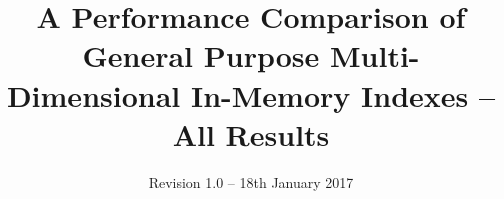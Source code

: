\documentclass{sig-alternate}
\makeatletter
\def\doi#1{\gdef\@doi{#1}}\def\@doi{}
\makeatother
\begin{document}






%

\title{A Performance Comparison of General Purpose Multi-Dimensional In-Memory Indexes -- All Results
}
\subtitle{Revision 1.0 -- 18th January 2017}


%
%
%
%
%

%
\end{document}

